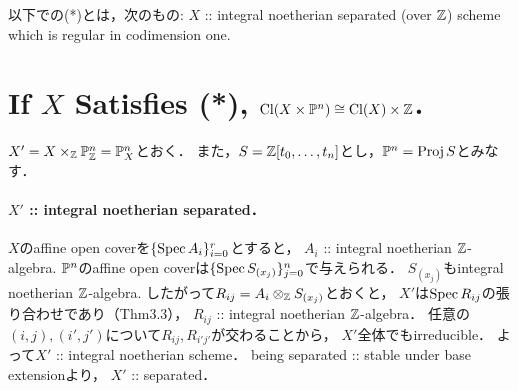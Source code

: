 \documentclass[a4paper]{jsarticle}
\newcommand{\Proj}{\operatorname{Proj}}
\newcommand{\Cl}{\operatorname{Cl}}
\begin{document}
    以下での(*)とは，次のもの:
    $X$ :: integral noetherian separated (over $\mathbb{Z}$) scheme which is regular in codimension one.

\section{If $X$ Satisfies (*), $\Cl(X \times \proj^n) \cong \Cl(X) \times \Z$.} %
    $X'=X \times_{\mathbb{Z}} \mathbb{P}^n_{\mathbb{Z}}=\mathbb{P}_X^n$とおく．
    また，$S=\mathbb{Z}[t_0,\dots,t_n]$とし，$\proj^n=\Proj S$とみなす．

    \paragraph{$X'$ :: integral noetherian separated．}
    $X$のaffine open coverを$\{\operatorname{Spec} A_i\}_{i=0}^r$とすると，
    $A_i$ :: integral noetherian $\mathbb{Z}$-algebra.
    $\mathbb{P}^n$のaffine open coverは$\{\operatorname{Spec} S_{(x_j)}\}_{j=0}^n$で与えられる．
    $S_{(x_j)}$もintegral noetherian $\mathbb{Z}$-algebra.
    したがって$R_{ij}=A_i \otimes_{\mathbb{Z}} S_{(x_j)}$とおくと，
    $X'$は$\operatorname{Spec} R_{ij}$の張り合わせであり（Thm3.3），
    $R_{ij}$ :: integral noetherian $\mathbb{Z}$-algebra．
    任意の$(i,j), (i',j')$について$R_{ij}, R_{i'j'}$が交わることから，
    $X'$全体でもirreducible．
    よって$X'$ :: integral noetherian scheme．
    being separated :: stable under base extensionより，
    $X'$ :: separated．
\end{document}

